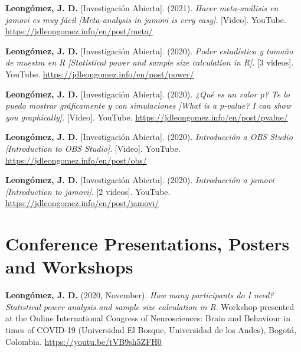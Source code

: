 \documentclass[11pt, a4paper]{awesome-cv}
\begin{document}
\begingroup
\setlength{\parindent}{-0.5in}
\setlength{\leftskip}{0.5in}

\hypertarget{refs_IA}{}
\leavevmode{}%
\textbf{Leongómez, J. D.} {[}Investigación Abierta{]}. (2021).
\emph{{Hacer meta-análisis en jamovi es muy fácil {[}Meta-analysis in
jamovi is very easy{]}}}. {[}Video{]}. YouTube.
\url{https://jdleongomez.info/en/post/meta/}

\leavevmode{}%
\textbf{Leongómez, J. D.} {[}Investigación Abierta{]}. (2020).
\emph{{Poder estadístico y tamaño de muestra en R {[}Statistical power
and sample size calculation in R{]}}}. {[}3 videos{]}. YouTube.
\url{https://jdleongomez.info/en/post/power/}

\leavevmode{}%
\textbf{Leongómez, J. D.} {[}Investigación Abierta{]}. (2020).
\emph{{¿Qué es un valor p? Te lo puedo mostrar gráficamente y con
simulaciones {[}What is a p-value? I can show you graphically{]}}}.
{[}Video{]}. YouTube. \url{https://jdleongomez.info/en/post/pvalue/}

\leavevmode{}%
\textbf{Leongómez, J. D.} {[}Investigación Abierta{]}. (2020).
\emph{{Introducción a OBS Studio {[}Introduction to OBS Studio{]}}}.
{[}Video{]}. YouTube. \url{https://jdleongomez.info/en/post/obs/}

\leavevmode{}%
\textbf{Leongómez, J. D.} {[}Investigación Abierta{]}. (2020).
\emph{{Introducción a jamovi {[}Introduction to jamovi{]}}}. {[}2
videos{]}. YouTube. \url{https://jdleongomez.info/en/post/jamovi/}

\endgroup

\hypertarget{conference-presentations-posters-and-workshops}{%
\section{Conference Presentations, Posters and
Workshops}\label{conference-presentations-posters-and-workshops}}

\begingroup
\setlength{\parindent}{-0.5in}
\setlength{\leftskip}{0.5in}

\textbf{Leongómez, J. D.} (2020, November). \emph{How many participants
do I need? Statistical power analysis and sample size calculation in R}.
Workshop presented at the Online International Congress of
Neurosciences: Brain and Behaviour in times of COVID-19 (Universidad El
Bosque, Universidad de los Andes), Bogotá, Colombia.
\url{https://youtu.be/tVB9sh5ZFH0}
\end{document}
